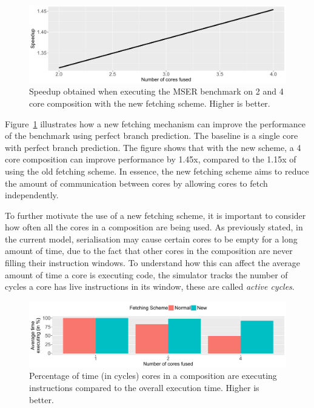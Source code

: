 \begin{figure}[t]
    \centering
    \includegraphics[width=1\textwidth]{chapter3/graphics/motiv_mser_fetch.pdf}
    \caption{Speedup obtained when executing the MSER benchmark on 2 and 4 core composition with the new fetching scheme. Higher is better.}
    \label{fig:motivation_fetch}
	\vspace{1em}
\end{figure}

Figure~\ref{fig:motivation_fetch} illustrates how a new fetching mechanism can improve the performance of the  benchmark using perfect branch prediction.
The baseline is a single core with perfect branch prediction.
The figure shows that with the new scheme, a 4 core composition can improve performance by 1.45x, compared to the 1.15x of using the old fetching scheme.
In essence, the new fetching scheme aims to reduce the amount of communication between cores by allowing cores to fetch independently.

To further motivate the use of a new fetching scheme, it is important to consider how often all the cores in a composition are being used.
As previously stated, in the current model, serialisation may cause certain cores to be empty for a long amount of time, due to the fact that other cores in the composition are never filling their instruction windows.
To understand how this can affect the average amount of time a core is executing code, the simulator tracks the number of cycles a core has live instructions in its window, these are called \textit{active cycles}.

\begin{figure}[t]
    \centering
    \includegraphics[width=1\textwidth]{chapter3/graphics/fetch_av_time.pdf}
    \caption{Percentage of time (in cycles) cores in a composition are executing instructions compared to the overall execution time. Higher is better.}
    \label{fig:motivation_perc}
	\vspace{1em}
\end{figure}

